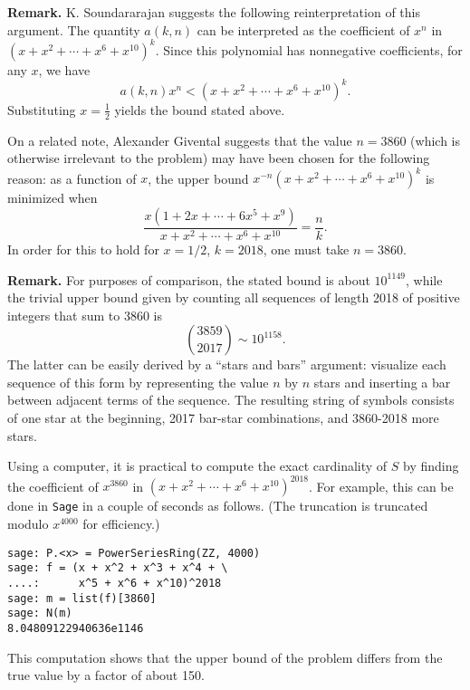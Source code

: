\documentclass[amssymb,twocolumn,pra,10pt,aps]{revtex4-1}
\begin{document}
\begin{itemize}
\noindent
\textbf{Remark.}
K. Soundararajan suggests the following reinterpretation of this argument. The quantity $a(k,n)$ can be interpreted as the coefficient of $x^n$ in $(x + x^2 + \cdots + x^6 + x^{10})^k$. Since this polynomial has nonnegative coefficients, 
for any $x$, we have
\[
a(k,n) x^n < (x + x^2 + \cdots + x^6 + x^{10})^k.
\]
Substituting $x = \frac{1}{2}$ yields the bound stated above.

On a related note, Alexander Givental suggests that the value $n=3860$ (which is otherwise irrelevant to the problem) may have been chosen for the following reason: as a function of $x$, the upper bound $x^{-n} (x+x^2 + \cdots + x^6 + x^{10})^k$
is minimized when
\[
\frac{x(1 + 2x + \cdots + 6x^5 + x^9)}{x + x^2 + \cdots + x^6 + x^{10}} = \frac{n}{k}.
\]
In order for this to hold for $x = 1/2$, $k=2018$, one must take $n = 3860$.

\noindent
\textbf{Remark.}
For purposes of comparison, the stated bound is about $10^{1149}$, while the trivial upper bound
given by counting all sequences of length 2018 of positive integers that sum to 3860 is
\[
\binom{3859}{2017} \sim 10^{1158}.
\]
The latter can be easily derived by a ``stars and bars'' argument: visualize each sequence of this form by representing the value $n$ by $n$ stars and inserting a bar between adjacent terms of the sequence. The resulting string of symbols consists of one star at the beginning, 2017 bar-star combinations, and 3860-2018 more stars.

Using a computer, it is practical to compute the exact cardinality of $S$ by finding the coefficient of $x^{3860}$ in
$(x + x^2 + \cdots + x^6 + x^{10})^{2018}$. For example, this can be done in \texttt{Sage} in a couple of seconds as follows. (The truncation is truncated modulo $x^{4000}$ for efficiency.)

\begin{verbatim}
sage: P.<x> = PowerSeriesRing(ZZ, 4000)
sage: f = (x + x^2 + x^3 + x^4 + \
....:      x^5 + x^6 + x^10)^2018
sage: m = list(f)[3860]
sage: N(m)
8.04809122940636e1146
\end{verbatim}

This computation shows that the upper bound of the problem differs from the true value by a factor of about 150.


\end{itemize}
\end{document}
